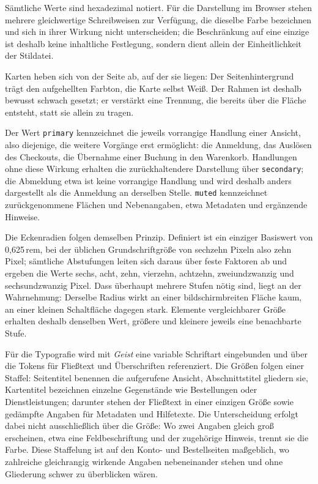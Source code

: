 Sämtliche Werte sind hexadezimal notiert. Für die Darstellung im
Browser stehen mehrere gleichwertige Schreibweisen zur Verfügung, die
dieselbe Farbe bezeichnen und sich in ihrer Wirkung nicht
unterscheiden; die Beschränkung auf eine einzige ist deshalb keine
inhaltliche Festlegung, sondern dient allein der Einheitlichkeit der
Stildatei.

Karten heben sich von der Seite ab, auf der sie liegen: Der
Seitenhintergrund trägt den aufgehellten Farbton, die Karte selbst
Weiß. Der Rahmen ist deshalb bewusst schwach gesetzt; er verstärkt
eine Trennung, die bereits über die Fläche entsteht, statt sie allein
zu tragen.

Der Wert \texttt{primary} kennzeichnet die jeweils vorrangige
Handlung einer Ansicht, also diejenige, die weitere Vorgänge erst
ermöglicht: die Anmeldung, das Auslösen des Checkouts, die Übernahme
einer Buchung in den Warenkorb. Handlungen ohne diese Wirkung
erhalten die zurückhaltendere Darstellung über \texttt{secondary};
die Abmeldung etwa ist keine vorrangige Handlung und wird deshalb
anders dargestellt als die Anmeldung an derselben Stelle.
\texttt{muted} kennzeichnet zurückgenommene Flächen und Nebenangaben,
etwa Metadaten und ergänzende Hinweise.

Die Eckenradien folgen demselben Prinzip. Definiert ist ein einziger
Basiswert von 0,625\,rem, bei der üblichen Grundschriftgröße von
sechzehn Pixeln also zehn Pixel; sämtliche Abstufungen
leiten sich daraus über feste Faktoren ab und ergeben die Werte
sechs, acht, zehn, vierzehn, achtzehn, zweiundzwanzig und
sechsundzwanzig Pixel. Dass überhaupt mehrere Stufen nötig sind,
liegt an der Wahrnehmung: Derselbe Radius wirkt an einer
bildschirmbreiten Fläche kaum, an einer kleinen Schaltfläche dagegen
stark. Elemente vergleichbarer Größe erhalten deshalb denselben Wert,
größere und kleinere jeweils eine benachbarte Stufe.

Für die Typografie wird mit \textit{Geist} eine variable Schriftart
eingebunden und über die Tokens für Fließtext und Überschriften
referenziert. Die Größen folgen einer Staffel: Seitentitel benennen
die aufgerufene Ansicht, Abschnittstitel gliedern sie, Kartentitel
bezeichnen einzelne Gegenstände wie Bestellungen oder
Dienstleistungen; darunter stehen der Fließtext in einer einzigen
Größe sowie gedämpfte Angaben für Metadaten und Hilfetexte. Die
Unterscheidung erfolgt dabei nicht ausschließlich über die Größe: Wo
zwei Angaben gleich groß erscheinen, etwa eine Feldbeschriftung und
der zugehörige Hinweis, trennt sie die Farbe. Diese Staffelung ist
auf den Konto- und Bestellseiten maßgeblich, wo zahlreiche
gleichrangig wirkende Angaben nebeneinander stehen und ohne
Gliederung schwer zu überblicken wären.

